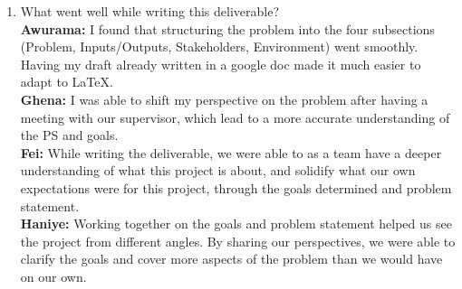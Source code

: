 \documentclass{article}
\begin{document}

% 

\begin{enumerate}
    \item What went well while writing this deliverable? \\
    \textbf{Awurama:} I found that structuring the problem into the four subsections (Problem, Inputs/Outputs, Stakeholders, Environment) went smoothly. Having my draft already written in a google doc made it much easier to adapt to LaTeX.
    \\\textbf{Ghena:} I was able to shift my perspective on the problem after having a meeting with our supervisor, which lead to a more accurate understanding of the PS and goals.
    \\\textbf{Fei:} While writing the deliverable, we were able to as a team have a deeper understanding of what this project is about, and solidify what our own expectations were for this project, through the goals determined and problem statement.
    \\\textbf{Haniye:} Working together on the goals and problem statement helped us see the project from different angles. By sharing our perspectives, we were able to clarify the goals and cover more aspects of the problem than we would have on our own.


\end{enumerate}
\end{document}
